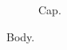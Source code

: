 \documentclass{svjour2}
\begin{document}
\begin{figure}\caption{Cap.}\end{figure}
Body.
\end{document}
